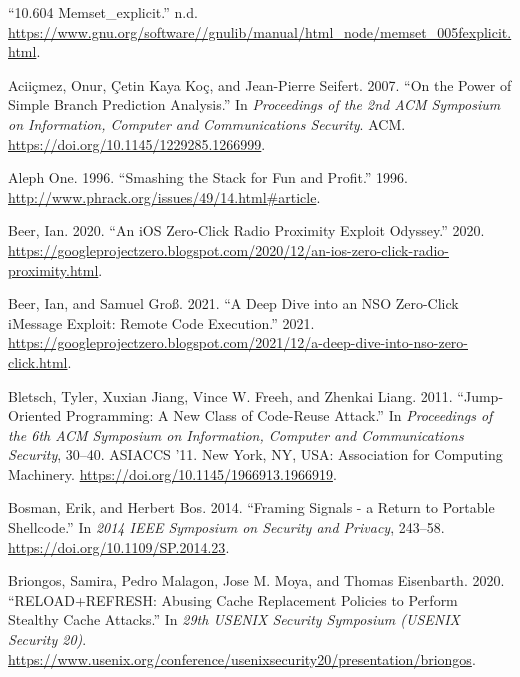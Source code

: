 \documentclass[
  a4paper,
]{report}
\newlength{\cslhangindent}
\newlength{\cslentryspacingunit} %
\newenvironment{CSLReferences}[2] %
 {%
  \setlength{\parindent}{0pt}
  \ifodd #1
  \let\oldpar\par
  \def\par{\hangindent=\cslhangindent\oldpar}
  \fi
  \setlength{\parskip}{#2\cslentryspacingunit}
 }%
 {}
\begin{document}
\hypertarget{refs}{}
\begin{CSLReferences}{1}{0}
\leavevmode{}%
{``10.604 Memset\_explicit.''} n.d.
\url{https://www.gnu.org/software//gnulib/manual/html_node/memset_005fexplicit.html}.

\leavevmode{}%
Aciiçmez, Onur, Çetin Kaya Koç, and Jean-Pierre Seifert. 2007. {``On the
Power of Simple Branch Prediction Analysis.''} In \emph{Proceedings of
the 2nd {ACM} Symposium on Information, Computer and Communications
Security}. {ACM}. \url{https://doi.org/10.1145/1229285.1266999}.

\leavevmode{}%
Aleph One. 1996. {``Smashing the Stack for Fun and Profit.''} 1996.
\url{http://www.phrack.org/issues/49/14.html\#article}.

\leavevmode{}%
Beer, Ian. 2020. {``An iOS Zero-Click Radio Proximity Exploit
Odyssey.''} 2020.
\url{https://googleprojectzero.blogspot.com/2020/12/an-ios-zero-click-radio-proximity.html}.

\leavevmode{}%
Beer, Ian, and Samuel Groß. 2021. {``A Deep Dive into an NSO Zero-Click
iMessage Exploit: Remote Code Execution.''} 2021.
\url{https://googleprojectzero.blogspot.com/2021/12/a-deep-dive-into-nso-zero-click.html}.

\leavevmode{}%
Bletsch, Tyler, Xuxian Jiang, Vince W. Freeh, and Zhenkai Liang. 2011.
{``Jump-Oriented Programming: A New Class of Code-Reuse Attack.''} In
\emph{Proceedings of the 6th ACM Symposium on Information, Computer and
Communications Security}, 30--40. ASIACCS '11. New York, NY, USA:
Association for Computing Machinery.
\url{https://doi.org/10.1145/1966913.1966919}.

\leavevmode{}%
Bosman, Erik, and Herbert Bos. 2014. {``Framing Signals - a Return to
Portable Shellcode.''} In \emph{2014 IEEE Symposium on Security and
Privacy}, 243--58. \url{https://doi.org/10.1109/SP.2014.23}.

\leavevmode{}%
Briongos, Samira, Pedro Malagon, Jose M. Moya, and Thomas Eisenbarth.
2020. {``{RELOAD+REFRESH}: Abusing Cache Replacement Policies to Perform
Stealthy Cache Attacks.''} In \emph{29th USENIX Security Symposium
(USENIX Security 20)}.
\url{https://www.usenix.org/conference/usenixsecurity20/presentation/briongos}.


\end{CSLReferences}
\end{document}
